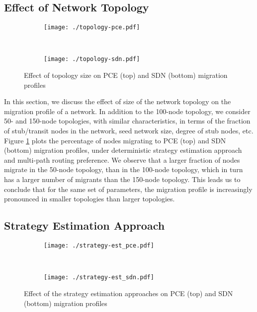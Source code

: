 \documentclass[smallextended]{svjour3}
\begin{document}
\subsection{Effect of Network Topology}

\begin{figure}
\centering
\begin{subfigure}
\centering
\texttt{[image: ./topology-pce.pdf]}
\end{subfigure}~ \begin{subfigure}
\centering
\texttt{[image: ./topology-sdn.pdf]}
\end{subfigure}
\caption{Effect of topology size on PCE (top) and SDN (bottom)
migration profiles}
\label{fig:effect of topology size}
\end{figure}

In this section, we discuss the effect of size of the network topology on the
migration profile of a network. In addition to the 100-node topology, we
consider 50- and 150-node topologies, with similar characteristics, in terms of
the fraction of stub/transit nodes in the network, seed network size, degree of
stub nodes, etc. Figure \ref{fig:effect of topology size} plots the percentage
of nodes migrating to PCE (top) and SDN (bottom) migration profiles, under
deterministic strategy estimation approach and multi-path routing preference. We
observe that a larger fraction of nodes migrate in the 50-node topology, than in
the 100-node topology, which in turn has a larger number of migrants than the
150-node topology. This leads us to conclude that for the same set of
parameters, the migration profile is increasingly pronounced in smaller
topologies than larger topologies.

\subsection{Strategy Estimation Approach}

\begin{figure}
\centering
\begin{subfigure}
\centering
\texttt{[image: ./strategy-est\_pce.pdf]}
\end{subfigure}~ \begin{subfigure}
\centering
\texttt{[image: ./strategy-est\_sdn.pdf]}
\end{subfigure}
\caption{Effect of the strategy estimation approaches on PCE (top) and SDN
(bottom) migration profiles}
\label{fig:effect of strategy estimation approach}
\end{figure}
\end{document}
